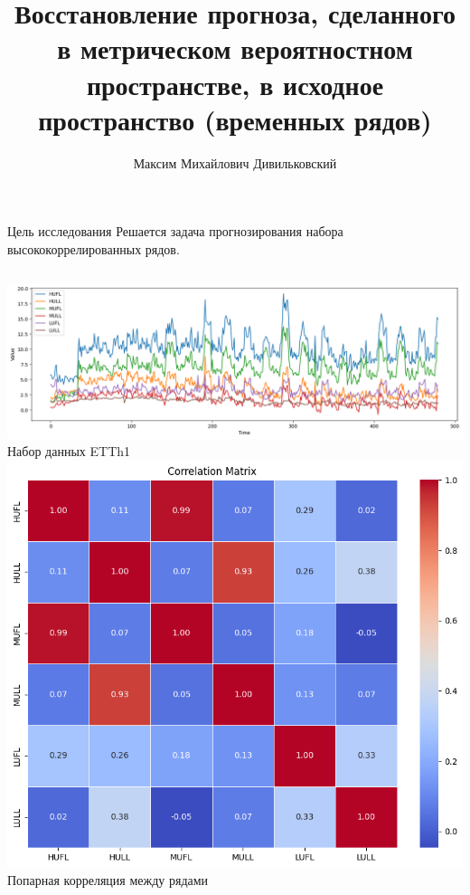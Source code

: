 \documentclass{beamer}
\title[\hbox to 56mm{Восстанвление прогноза}]{Восстановление прогноза, сделанного в метрическом вероятностном пространстве, в исходное пространство (временных рядов)}
\author[М. М. Дивильковский]{Максим Михайлович Дивильковский}
\institute{Московский физико-технический институт}
\date{\footnotesize
	\par\smallskip\emph{Курс:} Автоматизация научных исследований\par (практика, В.\,В.~Стрижов)/Группа 125
	\par\smallskip\emph{Эксперт:} В. В. Стрижов
	\par\smallskip\emph{Консультант:} К. Д. Яковлев
	\par\bigskip\small 2024}
\begin{document}
\begin{frame}
\thispagestyle{empty}
\maketitle
\end{frame}
\begin{frame}{Цель исследования}
	Решается задача прогнозирования набора высококоррелированных рядов.
	
	\begin{columns}[c]
		\includegraphics[width=1.0\textwidth]{Electricity}
		Набор данных ETTh1
		\includegraphics[width=1.0\textwidth]{Correlation}
		Попарная корреляция между рядами
	\end{columns}
\end{frame}
\end{document}
